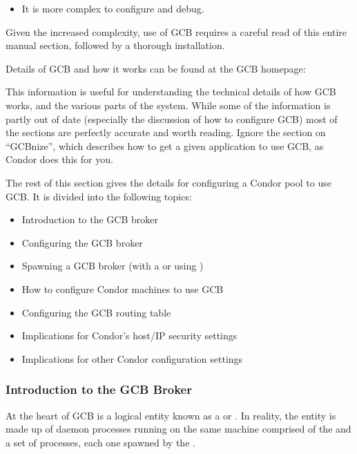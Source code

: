 \begin{itemize}
\item It is more complex to configure and debug.

\end{itemize}

Given the increased complexity, use of GCB requires a careful
read of this entire manual section, followed by a thorough
installation.

Details of GCB and how it works can be found at the GCB
homepage:


This information is useful for understanding the technical
details of how GCB works, and the various parts of the system.
While some of the information is partly out of date (especially the
discussion of how to configure GCB) most of the sections are perfectly
accurate and worth reading.
Ignore the section on ``GCBnize'', which describes
how to get a given application to use GCB, as 
Condor does this for you.

The rest of this section gives the details for configuring a
Condor pool to use GCB.
It is divided into the following topics:

\begin{itemize}
\item Introduction to the GCB broker
\item Configuring the GCB broker
\item Spawning a GCB broker (with a  or using )
\item How to configure Condor machines to use GCB
\item Configuring the GCB routing table
\item Implications for Condor's host/IP security settings
\item Implications for other Condor configuration settings
\end{itemize}


\subsubsection{\label{sec:GCB-Broker-Intro}Introduction to the GCB Broker}

At the heart of GCB is a logical entity known as a  or
.
In reality, the entity is made up of daemon
processes running on
the same machine comprised of the  and a set of
 processes, each one spawned by the
.

